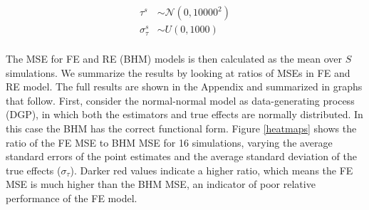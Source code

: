 \documentclass[12pt]{article}
\begin{document}


\begin{equation}
\begin{aligned}
\tau^s &\sim \mathcal{N}(0, 10000^2) \\
\sigma_{\tau}^s &\sim U(0,1000) \\
\end{aligned}
\end{equation}


The MSE for FE and RE (BHM) models is then calculated as the mean over $S$ simulations. We summarize the results by looking at ratios of MSEs in FE and RE model. The full results are shown in the Appendix and summarized in graphs that follow. First, consider the normal-normal model as data-generating process (DGP), in which both the estimators and true effects are normally distributed. In this case the BHM has the correct functional form. Figure \ref{heatmaps} shows the ratio of the FE MSE to BHM MSE for 16 simulations, varying the average standard errors of the point estimates and the average standard deviation of the true effects ($\sigma_{\tau}$). Darker red values indicate a higher ratio, which means the FE MSE is much higher than the BHM MSE, an indicator of poor relative performance of the FE model.
\end{document}
